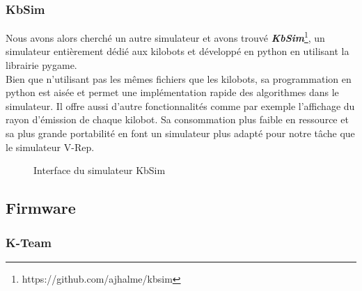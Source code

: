 \documentclass[a4paper,8pt]{report}
\begin{document}
\subsubsection*{KbSim}\label{subsubsec:name}

\medskip
Nous avons alors cherché un autre simulateur et avons trouvé \textit{\textbf{KbSim}}\footnote{https://github.com/ajhalme/kbsim}, un simulateur entièrement dédié aux kilobots et développé en python en utilisant la librairie pygame.\\
Bien que n'utilisant pas les mêmes fichiers que les kilobots, sa programmation en python est aisée et permet une implémentation rapide des algorithmes dans le simulateur. Il offre aussi d'autre fonctionnalités comme par exemple l'affichage du rayon d'émission de chaque kilobot. Sa consommation plus faible en ressource et sa plus grande portabilité en font un simulateur plus adapté pour notre tâche que le simulateur V-Rep.\\

\begin{figure}[!h]
    \centering
    \caption{Interface du simulateur KbSim}
\end{figure}

\newpage
\subsection*{Firmware}\label{subsec:name}

\subsubsection*{K-Team}\label{subsubsec:name}
\end{document}
